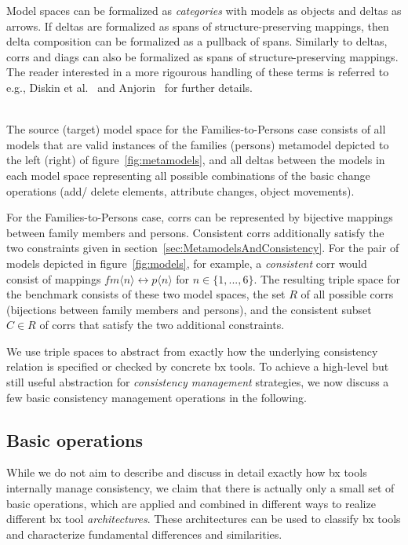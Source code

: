 Model spaces can be formalized as \emph{categories} with models as objects and deltas as arrows.
If deltas are formalized as spans of structure-preserving mappings, then delta composition can be formalized as a pullback of spans.
Similarly to deltas, corrs and diags can also be formalized as spans of structure-preserving mappings.
The reader interested in a more rigourous handling of these terms is referred to e.g., Diskin et al.~\cite{JOT:issue_2011_01/article6} and Anjorin~\cite{DBLP:conf/ac/Anjorin16} for further details.

\begin{example}~\\
The source (target) model space for the Families-to-Persons case consists of all models that are valid instances of the families (persons) metamodel depicted to the left (right) of figure~\ref{fig:metamodels}, and all deltas between the models in each model space representing all possible combinations of the basic change operations (add/ delete elements, attribute changes, object movements).

For the Families-to-Persons case, corrs can be represented by bijective mappings between family members and persons.
Consistent corrs additionally satisfy the two constraints given in section~\ref{sec:MetamodelsAndConsistency}.  
For the pair of models depicted in figure~\ref{fig:models}, for example, a \emph{consistent} corr would consist of mappings $fm\langle n \rangle \leftrightarrow p\langle n \rangle$ for $n \in \{1, ..., 6 \}$.
%
The resulting triple space for the benchmark consists of these two model spaces, the set $R$ of all possible corrs (bijections between family members and persons), and the consistent subset $C \in R$ of corrs that satisfy the two additional constraints. 
\end{example}

We use triple spaces to abstract from exactly how the underlying consistency relation is specified or checked by concrete bx tools.
To achieve a high-level but still useful abstraction for \emph{consistency management} strategies, we now discuss a few basic consistency management operations in the following. 


\subsection{Basic operations}
\label{sec:basicOperations}

While we do not aim to describe and discuss in detail exactly how bx tools internally manage consistency, we claim that there is actually only a small set of basic operations, which are applied and combined in different ways to realize different bx tool \emph{architectures}.
These architectures can be used to classify bx tools and characterize fundamental differences and similarities.

